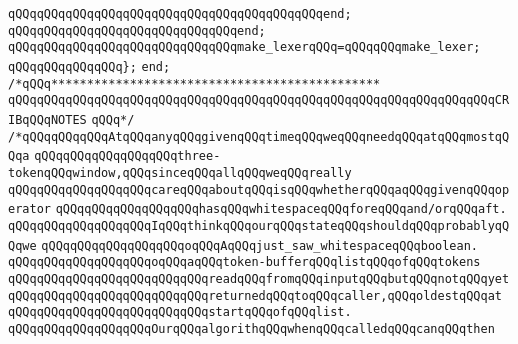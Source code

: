 \verb|qQQqqQQqqQQqqQQqqQQqqQQqqQQqqQQqqQQqqQQqqQQqend;|\newline
\verb|qQQqqQQqqQQqqQQqqQQqqQQqqQQqqQQqend;|\newline
\newline
\verb|qQQqqQQqqQQqqQQqqQQqqQQqqQQqqQQqmake_lexerqQQq=qQQqqQQqmake_lexer;|\newline
\verb|qQQqqQQqqQQqqQQq};|\newline
\verb|end;|\newline
\newline
\newline
\newline
\newline
\newline
\verb|/*qQQq**********************************************|\newline
\verb|qQQqqQQqqQQqqQQqqQQqqQQqqQQqqQQqqQQqqQQqqQQqqQQqqQQqqQQqqQQqqQQqqQQqCRIBqQQqNOTES|\newline
\verb|qQQq*/|\newline
\verb|/*qQQqqQQqqQQqAtqQQqanyqQQqgivenqQQqtimeqQQqweqQQqneedqQQqatqQQqmostqQQqa|\newline
\verb|qQQqqQQqqQQqqQQqqQQqthree-tokenqQQqwindow,qQQqsinceqQQqallqQQqweqQQqreally|\newline
\verb|qQQqqQQqqQQqqQQqqQQqcareqQQqaboutqQQqisqQQqwhetherqQQqaqQQqgivenqQQqoperator|\newline
\verb|qQQqqQQqqQQqqQQqqQQqhasqQQqwhitespaceqQQqforeqQQqand/orqQQqaft.|\newline
\newline
\verb|qQQqqQQqqQQqqQQqqQQqIqQQqthinkqQQqourqQQqstateqQQqshouldqQQqprobablyqQQqwe|\newline
\newline
\verb|qQQqqQQqqQQqqQQqqQQqoqQQqAqQQqjust_saw_whitespaceqQQqboolean.|\newline
\newline
\verb|qQQqqQQqqQQqqQQqqQQqoqQQqaqQQqtoken-bufferqQQqlistqQQqofqQQqtokens|\newline
\verb|qQQqqQQqqQQqqQQqqQQqqQQqqQQqreadqQQqfromqQQqinputqQQqbutqQQqnotqQQqyet|\newline
\verb|qQQqqQQqqQQqqQQqqQQqqQQqqQQqreturnedqQQqtoqQQqcaller,qQQqoldestqQQqat|\newline
\verb|qQQqqQQqqQQqqQQqqQQqqQQqqQQqstartqQQqofqQQqlist.|\newline
\newline
\verb|qQQqqQQqqQQqqQQqqQQqOurqQQqalgorithqQQqwhenqQQqcalledqQQqcanqQQqthen|\newline
